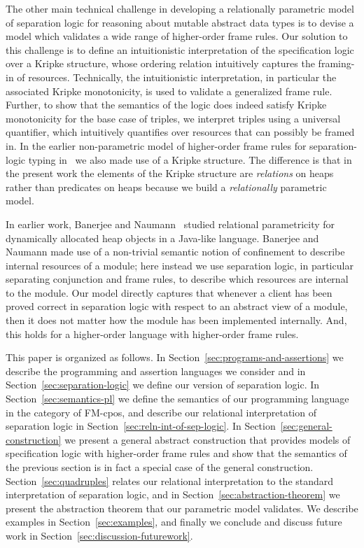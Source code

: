 \documentclass{LMCS}
\begin{document}
The other main technical challenge in developing a relationally parametric
model of separation logic for reasoning about mutable abstract data types
is to devise a model which validates a wide range
of higher-order frame rules.  Our solution to this challenge is to
define an intuitionistic interpretation of the specification
logic over a Kripke structure, whose ordering relation intuitively
captures the framing-in of resources.
Technically, the intuitionistic interpretation, in particular the
associated Kripke monotonicity, is used to validate a generalized frame rule.
Further, to show that the semantics of the logic does indeed satisfy
Kripke monotonicity for the base case of triples, we
interpret triples using a universal quantifier, which
intuitively quantifies over resources that can possibly be framed in.
In the earlier non-parametric model of higher-order frame rules for
separation-logic typing in~\cite{birkedal-torpsmith-yang-lics05} we also
made use of a Kripke structure. The difference is that in the present work
the elements of the Kripke structure are \emph{relations} on heaps rather than
predicates on heaps because we build a \emph{relationally} parametric
model.

In earlier work, Banerjee and Naumann~\cite{banerjee:naumann:jacm} studied
relational parametricity for dynamically allocated heap objects in a
Java-like language. Banerjee and Naumann made use of a non-trivial semantic
notion of confinement to describe internal resources of a module; here
instead we use separation logic, in particular separating conjunction and
frame rules, to describe which resources are internal to the module.  Our
model directly captures that whenever a client has been proved correct in
separation logic with respect to an abstract view of a module, then it does
not matter how the module has been implemented internally. And, this holds
for a higher-order language with higher-order frame rules.

This paper is organized as follows.
In Section~\ref{sec:programs-and-assertions} we describe the
programming and assertion languages we consider and in
Section~\ref{sec:separation-logic} we define our version of separation
logic.  In Section~\ref{sec:semantics-pl} we define the semantics of our
programming language in the category of FM-cpos, and describe our
relational interpretation of separation logic in
Section~\ref{sec:reln-int-of-sep-logic}. In
Section~\ref{sec:general-construction} we present a general abstract
construction that provides models of specification logic with higher-order
frame rules and show that the semantics of the previous section is in fact
a special case of the general construction. 
Section~\ref{sec:quadruples}
relates our relational interpretation to the standard interpretation of
separation logic, and in Section~\ref{sec:abstraction-theorem} we present
the abstraction theorem that our parametric model validates. 
We describe examples in Section~\ref{sec:examples}, and
finally we conclude and discuss future work in
Section~\ref{sec:discussion-futurework}.
\end{document}
